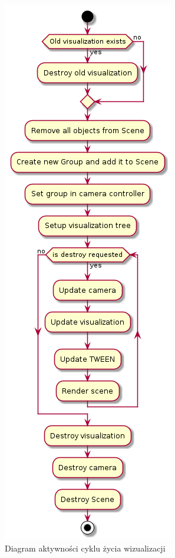 \begin{figure}
    \centering
    \includegraphics[scale=0.6]{diagrams/out/c3_lifecycle.png}
    \caption{Diagram aktywności cyklu życia wizualizacji}
    \label{fig:c3_lifecycle}
\end{figure}

